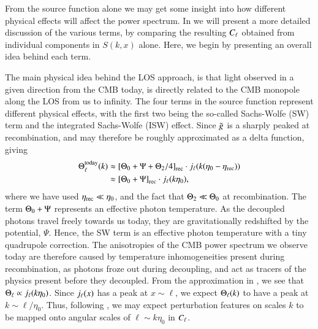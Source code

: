 From the source function alone we may get some insight into how different physical effects will affect the power spectrum. In  we will present a more detailed discussion of the various terms, by comparing the resulting $C_\ell$ obtained from individual components in $S(k,x)$ alone. Here, we begin by presenting an overall idea behind each term.  

The main physical idea behind the LOS approach, is that light observed in a given direction from the CMB today, is directly related to the CMB monopole along the LOS from us to infinity. The four terms in the source function represent different physical effects, with the first two being the so-called Sachs-Wolfe (SW) term and the integrated Sachs-Wolfe (ISW) effect. Since $\tilde{g}$ is a sharply peaked at recombination, and may therefore be roughly approximated as a delta function, giving   
\begin{equation} \label{eq:M4:theory:Theta_ell_today_SW_approximation}
    \begin{split}
        \Theta_\ell^\mathrm{today}(k)&\approx \left[ \Theta_0 + \Psi + \Theta_2/4 \right]_\mathrm{rec}\cdot j_\ell(k(\eta_0-\eta_\mathrm{rec})) \\ 
        &\approx\left[ \Theta_0 + \Psi \right]_\mathrm{rec}\cdot j_\ell(k\eta_0) , 
    \end{split}
\end{equation}
where we have used $\eta_\mathrm{rec}\ll\eta_0$, and the fact that $\Theta_2\ll\Theta_0$ at recombination. The term $\Theta_0+\Psi$ represents an effective photon temperature. As the decoupled photons travel freely towards us today, they are gravitationally redshifted by the potential, $\Psi$. Hence, the SW term is an effective photon temperature with a tiny quadrupole correction. The anisotropies of the CMB power spectrum we observe today are therefore caused by temperature inhomogeneities present during recombination, as photons froze out during decoupling, and act as tracers of the physics present before they decoupled.  From the approximation in , we see that $\Theta_\ell\propto j_\ell(k\eta_0)$. Since $j_\ell(x)$ has a peak at $x\sim\ell$, we expect $\Theta_\ell(k)$ to have a peak at $k\sim\ell/\eta_0$. Thus, following , we may expect perturbation features on scales $k$ to be mapped onto angular scales of $\ell\sim k\eta_0$ in $C_\ell$. 

